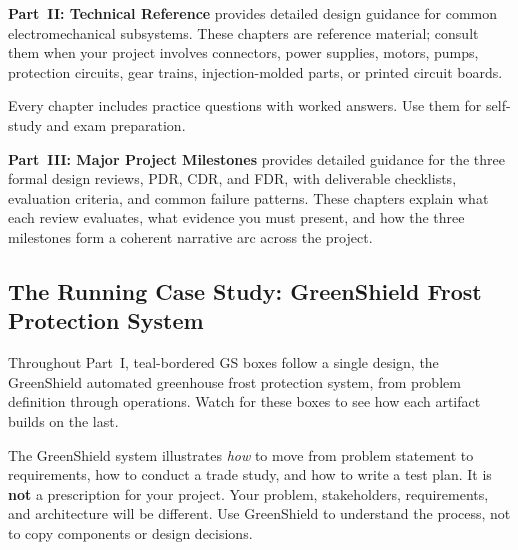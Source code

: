 \documentclass[11pt,letterpaper,twoside,openany]{book}
\begin{document}
\textbf{Part~II: Technical Reference} provides detailed design guidance for common electromechanical subsystems. These chapters are reference material; consult them when your project involves connectors, power supplies, motors, pumps, protection circuits, gear trains, injection-molded parts, or printed circuit boards.

Every chapter includes practice questions with worked answers. Use them for self-study and exam preparation.

\textbf{Part~III: Major Project Milestones} provides detailed guidance for the three formal design reviews, PDR, CDR, and FDR, with deliverable checklists, evaluation criteria, and common failure patterns. These chapters explain what each review evaluates, what evidence you must present, and how the three milestones form a coherent narrative arc across the project.

\subsection*{The Running Case Study: GreenShield Frost Protection System}
Throughout Part~I, teal-bordered \textsf{GS} boxes follow a single design, the GreenShield automated greenhouse frost protection system, from problem definition through operations. Watch for these boxes to see how each artifact builds on the last.


\begin{warningbox}
The GreenShield system illustrates \emph{how} to move from problem statement to requirements, how to conduct a trade study, and how to write a test plan. It is \textbf{not} a prescription for your project. Your problem, stakeholders, requirements, and architecture will be different. Use GreenShield to understand the process, not to copy components or design decisions.
\end{warningbox}
\end{document}
